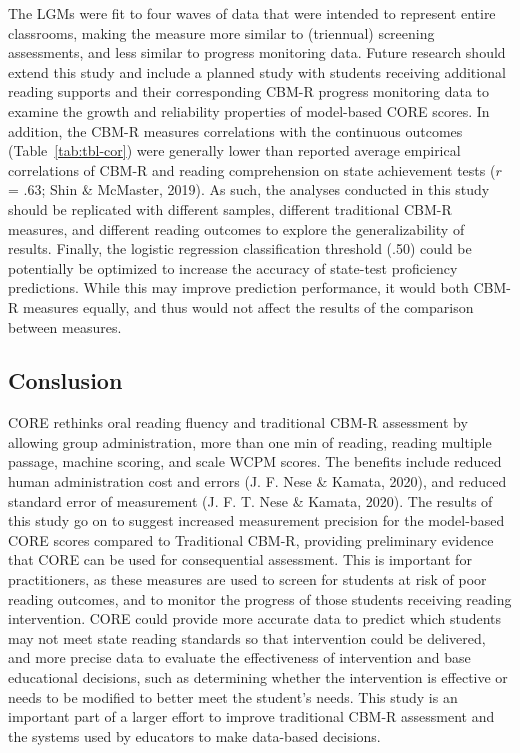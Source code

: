 \documentclass[
  english,
  man, fleqn, noextraspace]{apa6}
\begin{document}
The LGMs were fit to four waves of data that were intended to represent entire classrooms, making the measure more similar to (triennual) screening assessments, and less similar to progress monitoring data. Future research should extend this study and include a planned study with students receiving additional reading supports and their corresponding CBM-R progress monitoring data to examine the growth and reliability properties of model-based CORE scores. In addition, the CBM-R measures correlations with the continuous outcomes (Table~\ref{tab:tbl-cor}) were generally lower than reported average empirical correlations of CBM-R and reading comprehension on state achievement tests (\(r\) = .63; Shin \& McMaster, 2019). As such, the analyses conducted in this study should be replicated with different samples, different traditional CBM-R measures, and different reading outcomes to explore the generalizability of results. Finally, the logistic regression classification threshold (.50) could be potentially be optimized to increase the accuracy of state-test proficiency predictions. While this may improve prediction performance, it would both CBM-R measures equally, and thus would not affect the results of the comparison between measures.

\hypertarget{conslusion}{%
\subsection{Conslusion}\label{conslusion}}

CORE rethinks oral reading fluency and traditional CBM-R assessment by allowing group administration, more than one min of reading, reading multiple passage, machine scoring, and scale WCPM scores. The benefits include reduced human administration cost and errors (J. F. Nese \& Kamata, 2020), and reduced standard error of measurement (J. F. T. Nese \& Kamata, 2020). The results of this study go on to suggest increased measurement precision for the model-based CORE scores compared to Traditional CBM-R, providing preliminary evidence that CORE can be used for consequential assessment. This is important for practitioners, as these measures are used to screen for students at risk of poor reading outcomes, and to monitor the progress of those students receiving reading intervention. CORE could provide more accurate data to predict which students may not meet state reading standards so that intervention could be delivered, and more precise data to evaluate the effectiveness of intervention and base educational decisions, such as determining whether the intervention is effective or needs to be modified to better meet the student's needs. This study is an important part of a larger effort to improve traditional CBM-R assessment and the systems used by educators to make data-based decisions.
\end{document}
